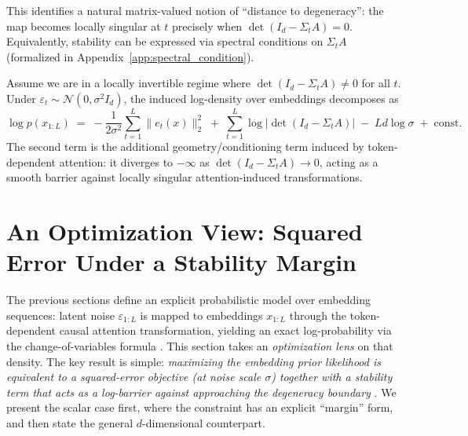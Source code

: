 \documentclass[11pt]{article}
\begin{document}
This identifies a natural matrix-valued notion of ``distance to degeneracy'': the map becomes locally singular at $t$ precisely when $\det(I_d-\Sigma_tA)=0$.
Equivalently, stability can be expressed via spectral conditions on $\Sigma_tA$ (formalized in Appendix~\ref{app:spectral_condition}).

\begin{corollary}
\label{cor:logdet_penalty}
Assume we are in a locally invertible regime where $\det(I_d-\Sigma_tA)\neq 0$ for all $t$.
Under $\varepsilon_t \sim \mathcal{N}(0,\sigma^2 I_d)$, the induced log-density over embeddings decomposes as
\begin{equation}
\log p(x_{1:L})
\;=\;
-\frac{1}{2\sigma^2}\sum_{t=1}^L \|e_t(x)\|_2^2
\;+\;
\sum_{t=1}^L \log\left|\det\!\left(I_d-\Sigma_t A\right)\right|
\;-\;
Ld\log\sigma
\;+\; \mathrm{const}.
\label{eq:loglik_matrix_decomp}
\end{equation}
The second term is the additional geometry/conditioning term induced by token-dependent attention: it diverges to $-\infty$ as $\det(I_d-\Sigma_tA)\to 0$, acting as a smooth barrier against locally singular attention-induced transformations.
\end{corollary}


\section{An Optimization View: Squared Error Under a Stability Margin}
\label{sec:training_objective}

The previous sections define an explicit probabilistic model over embedding sequences:
latent noise $\varepsilon_{1:L}$ is mapped to embeddings $x_{1:L}$ through the
token-dependent causal attention transformation, yielding an exact log-probability via the change-of-variables formula
\citep{PapamakariosNaReMoLa21}.
This section takes an \emph{optimization lens} on that density.
The key result is simple: \emph{maximizing the embedding prior likelihood is equivalent to a
squared-error objective (at noise scale $\sigma$) together with a stability term that acts as a
log-barrier against approaching the degeneracy boundary} \citep{BoydVa04}.
We present the scalar case first, where the constraint has an explicit ``margin'' form,
and then state the general $d$-dimensional counterpart.
\end{document}
